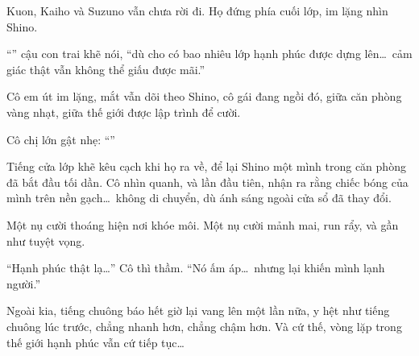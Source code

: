 \documentclass[../main.tex]{subfiles}
\begin{document}
Kuon, Kaiho và Suzuno vẫn chưa rời đi. Họ đứng phía cuối lớp, im lặng nhìn Shino.

``'' cậu con trai khẽ nói, “dù cho có bao nhiêu lớp hạnh phúc được dựng lên\dots\ cảm giác thật vẫn không thể giấu được mãi.''

Cô em út im lặng, mắt vẫn dõi theo Shino, cô gái đang ngồi đó, giữa căn phòng vàng nhạt, giữa thế giới được lập trình để cười.

Cô chị lớn gật nhẹ: ``''

Tiếng cửa lớp khẽ kêu cạch khi họ ra về, để lại Shino một mình trong căn phòng đã bắt đầu tối dần. Cô nhìn quanh, và lần đầu tiên, nhận ra rằng chiếc bóng của mình trên nền gạch\dots\ không di chuyển, dù ánh sáng ngoài cửa sổ đã thay đổi.

Một nụ cười thoáng hiện nơi khóe môi. Một nụ cười mảnh mai, run rẩy, và gần như tuyệt vọng.

``Hạnh phúc thật lạ\dots'' Cô thì thầm. ``Nó ấm áp\dots\ nhưng lại khiến mình lạnh người.”

Ngoài kia, tiếng chuông báo hết giờ lại vang lên một lần nữa, y hệt như tiếng chuông lúc trước, chẳng nhanh hơn, chẳng chậm hơn. Và cứ thế, vòng lặp trong thế giới hạnh phúc vẫn cứ tiếp tục\dots
\end{document}
